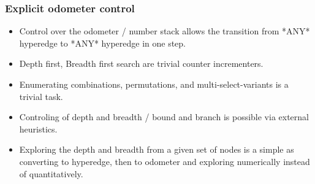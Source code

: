 \documentclass{beamer}
\begin{document}
	\begin{frame}
	\frametitle{Explicit odometer control}
	\begin{itemize}
	\item Control over the odometer / number stack allows the transition from *ANY* hyperedge to *ANY* hyperedge in one step. 
	\item Depth first, Breadth first search are trivial counter incrementers.
	\item Enumerating combinations, permutations, and multi-select-variants is a trivial task.
	\item Controling of depth and breadth / bound and branch is possible via external heuristics.
	\item Exploring the depth and breadth from a given set of nodes is a simple as converting to hyperedge, then to odometer and exploring numerically instead of quantitatively. 
	\end{itemize}
	\end{frame}
	
\end{document}
